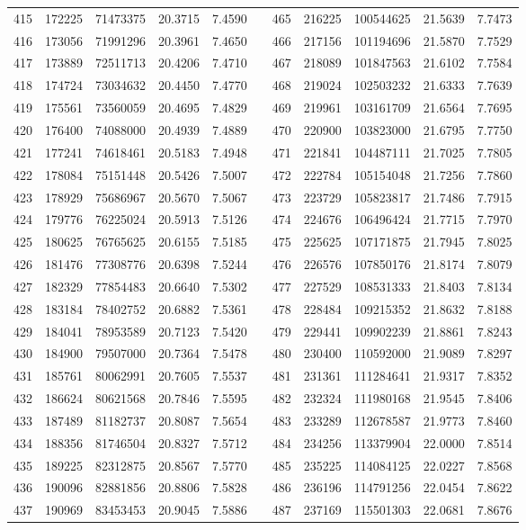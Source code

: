 \begin{longtable}{rrrrrrrrrrr}
415&172225&71473375&20.3715&7.4590&&465&216225&100544625&21.5639&7.7473\\
416&173056&71991296&20.3961&7.4650&&466&217156&101194696&21.5870&7.7529\\
417&173889&72511713&20.4206&7.4710&&467&218089&101847563&21.6102&7.7584\\
418&174724&73034632&20.4450&7.4770&&468&219024&102503232&21.6333&7.7639\\
419&175561&73560059&20.4695&7.4829&&469&219961&103161709&21.6564&7.7695\\
420&176400&74088000&20.4939&7.4889&&470&220900&103823000&21.6795&7.7750\\
421&177241&74618461&20.5183&7.4948&&471&221841&104487111&21.7025&7.7805\\
422&178084&75151448&20.5426&7.5007&&472&222784&105154048&21.7256&7.7860\\
423&178929&75686967&20.5670&7.5067&&473&223729&105823817&21.7486&7.7915\\
424&179776&76225024&20.5913&7.5126&&474&224676&106496424&21.7715&7.7970\\
425&180625&76765625&20.6155&7.5185&&475&225625&107171875&21.7945&7.8025\\
426&181476&77308776&20.6398&7.5244&&476&226576&107850176&21.8174&7.8079\\
427&182329&77854483&20.6640&7.5302&&477&227529&108531333&21.8403&7.8134\\
428&183184&78402752&20.6882&7.5361&&478&228484&109215352&21.8632&7.8188\\
429&184041&78953589&20.7123&7.5420&&479&229441&109902239&21.8861&7.8243\\
430&184900&79507000&20.7364&7.5478&&480&230400&110592000&21.9089&7.8297\\
431&185761&80062991&20.7605&7.5537&&481&231361&111284641&21.9317&7.8352\\
432&186624&80621568&20.7846&7.5595&&482&232324&111980168&21.9545&7.8406\\
433&187489&81182737&20.8087&7.5654&&483&233289&112678587&21.9773&7.8460\\
434&188356&81746504&20.8327&7.5712&&484&234256&113379904&22.0000&7.8514\\
435&189225&82312875&20.8567&7.5770&&485&235225&114084125&22.0227&7.8568\\
436&190096&82881856&20.8806&7.5828&&486&236196&114791256&22.0454&7.8622\\
437&190969&83453453&20.9045&7.5886&&487&237169&115501303&22.0681&7.8676\\

\end{longtable}
